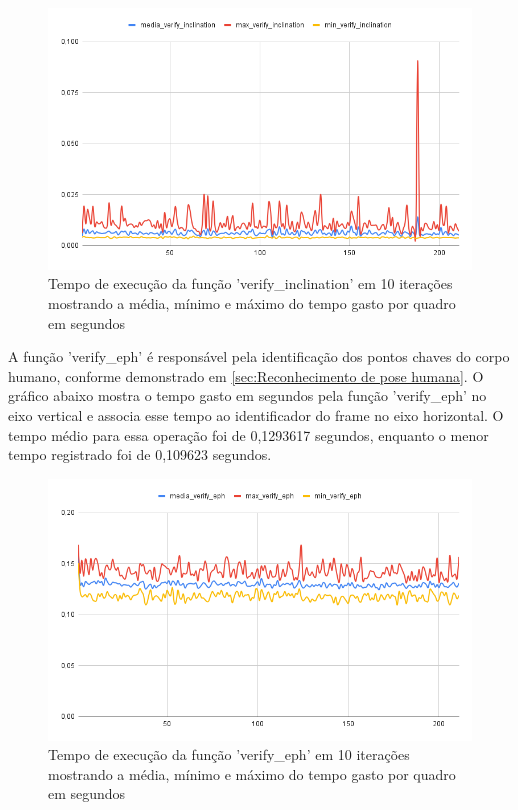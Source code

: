 \begin{figure}[!htb]
	\centering
	\includegraphics[scale=0.6]{figuras/grafico/inclination.png}
	\caption{Tempo de execução da função 'verify\_inclination' em 10 iterações mostrando a média, mínimo e máximo do tempo gasto por quadro em segundos}
\end{figure}





A função 'verify\_eph' é responsável pela identificação dos pontos chaves do corpo humano, conforme demonstrado em \ref{sec:Reconhecimento de pose humana}. O gráfico abaixo mostra o tempo gasto em segundos pela função 'verify\_eph' no eixo vertical e associa esse tempo ao identificador do frame no eixo horizontal. O tempo médio para essa operação foi de 0,1293617 segundos, enquanto o menor tempo registrado foi de 0,109623 segundos.


\begin{figure}[!htb]
	\centering
	\includegraphics[scale=0.5]{figuras/grafico/eph.png}
	\caption{Tempo de execução da função 'verify\_eph' em 10 iterações mostrando a média, mínimo e máximo do tempo gasto por quadro em segundos}
\end{figure}






